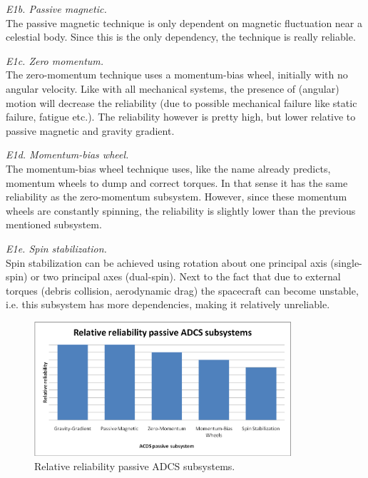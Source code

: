 \begin{enumerate}[A]
\textit{E1b. Passive magnetic.}\\
The passive magnetic technique is only dependent on magnetic fluctuation near a celestial body. Since this is the only dependency, the technique is really reliable.

\textit{E1c. Zero momentum.}\\
The zero-momentum technique uses a momentum-bias wheel, initially with no angular velocity. Like with all mechanical systems, the presence of (angular) motion will decrease the reliability (due to possible mechanical failure like static failure, fatigue etc.). The reliability however is pretty high, but lower relative to passive magnetic and gravity gradient.

\textit{E1d. Momentum-bias wheel.}\\ 
The momentum-bias wheel technique uses, like the name already predicts, momentum wheels to dump and correct torques. In that sense it has the same reliability as the zero-momentum subsystem. However, since these momentum wheels are constantly spinning, the reliability is slightly lower than the previous mentioned subsystem.

\textit{E1e. Spin stabilization.}\\
Spin stabilization can be achieved using rotation about one principal axis (single-spin) or two principal axes (dual-spin).  Next to the fact that due to external torques (debris collision, aerodynamic drag) the spacecraft can become unstable, i.e. this subsystem has more dependencies, making it relatively unreliable.

\begin{figure} [h]
	\begin{center}
 \includegraphics[width=0.85\textwidth,angle=0]{chapters/img/TRA_ADCS_P.png}	
	\caption{Relative reliability passive ADCS subsystems.}
	\label{TRA_ADCS_P}
	\end{center}
\end{figure}


\end{enumerate}
